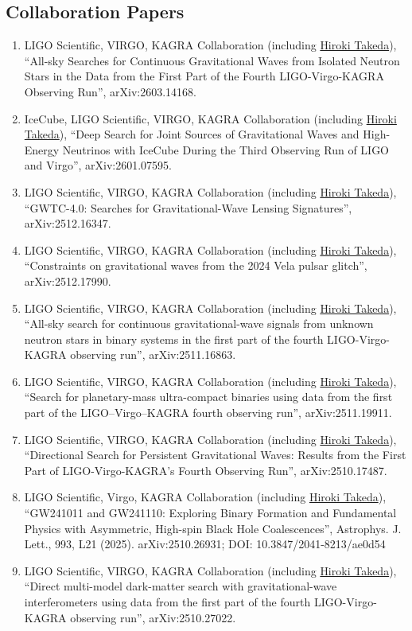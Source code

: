 \documentclass[uplatex, 12pt]{article}
\begin{document}
\subsection*{Collaboration Papers}
\begin{enumerate}
\item LIGO Scientific, VIRGO, KAGRA Collaboration (including \uline{Hiroki Takeda}), “All-sky Searches for Continuous Gravitational Waves from Isolated Neutron Stars in the Data from the First Part of the Fourth LIGO-Virgo-KAGRA Observing Run”, arXiv:2603.14168.
\item IceCube, LIGO Scientific, VIRGO, KAGRA Collaboration (including \uline{Hiroki Takeda}), “Deep Search for Joint Sources of Gravitational Waves and High-Energy Neutrinos with IceCube During the Third Observing Run of LIGO and Virgo”, arXiv:2601.07595.
\item LIGO Scientific, VIRGO, KAGRA Collaboration (including \uline{Hiroki Takeda}), “GWTC-4.0: Searches for Gravitational-Wave Lensing Signatures”, arXiv:2512.16347.
\item LIGO Scientific, VIRGO, KAGRA Collaboration (including \uline{Hiroki Takeda}), “Constraints on gravitational waves from the 2024 Vela pulsar glitch”, arXiv:2512.17990.
\item LIGO Scientific, VIRGO, KAGRA Collaboration (including \uline{Hiroki Takeda}), “All-sky search for continuous gravitational-wave signals from unknown neutron stars in binary systems in the first part of the fourth LIGO-Virgo-KAGRA observing run”, arXiv:2511.16863.
\item LIGO Scientific, VIRGO, KAGRA Collaboration (including \uline{Hiroki Takeda}), “Search for planetary-mass ultra-compact binaries using data from the first part of the LIGO--Virgo--KAGRA fourth observing run”, arXiv:2511.19911.
\item LIGO Scientific, VIRGO, KAGRA Collaboration (including \uline{Hiroki Takeda}), “Directional Search for Persistent Gravitational Waves: Results from the First Part of LIGO-Virgo-KAGRA's Fourth Observing Run”, arXiv:2510.17487.
\item LIGO Scientific, Virgo, KAGRA Collaboration (including \uline{Hiroki Takeda}), “GW241011 and GW241110: Exploring Binary Formation and Fundamental Physics with Asymmetric, High-spin Black Hole Coalescences”, Astrophys. J. Lett., 993, L21 (2025). arXiv:2510.26931; DOI: 10.3847/2041-8213/ae0d54
\item LIGO Scientific, VIRGO, KAGRA Collaboration (including \uline{Hiroki Takeda}), “Direct multi-model dark-matter search with gravitational-wave interferometers using data from the first part of the fourth LIGO-Virgo-KAGRA observing run”, arXiv:2510.27022.

\end{enumerate}
\end{document}
